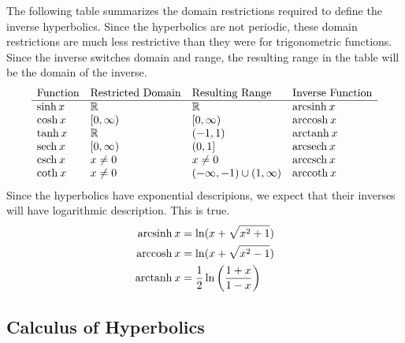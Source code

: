 \documentclass[fleqn]{report}
\begin{document}
The following table summarizes the domain restrictions
required to define the inverse hyperbolics. Since the
hyperbolics are not periodic, these domain restrictions are
much less restrictive than they were for trigonometric
functions. Since the inverse switches domain and range, the
resulting range in the table will be the domain of the
inverse.
\begin{displaymath}
\begin{array}{llll}
\text{Function} & \text{Restricted Domain} & \text{Resulting
Range} & \text{Inverse Function} \\
\hline
\sinh x & \mathbb{R} & \mathbb{R} & \mathrm{arcsinh\hspace{0.07cm}} x \\
\cosh x & [0, \infty) & [0, \infty) & \mathrm{arccosh\hspace{0.07cm}} x \\
\tanh x & \mathbb{R} & (-1,1) & \mathrm{arctanh\hspace{0.07cm}} x \\
\mathrm{sech}\hspace{0.07cm} x & [0, \infty) & (0, 1] & \mathrm{arcsech\hspace{0.07cm}} x \\
\mathrm{csch}\hspace{0.07cm} x & x \neq 0 & x \neq 0 & \mathrm{arccsch\hspace{0.07cm}} x \\
\mathrm{coth}\hspace{0.07cm} x & x \neq 0 & (-\infty,-1) \cup (1, \infty) & \mathrm{arccoth\hspace{0.07cm}} x 
\end{array}
\end{displaymath}
Since the hyperbolics have exponential descripions, we expect
that their inverses will have logarithmic description.
This is true.
\begin{align*}
\mathrm{arcsinh\hspace{0.07cm}} x & = \ln (x + \sqrt{x^2 +1} ) \\
\mathrm{arccosh\hspace{0.07cm}} x & = \ln (x + \sqrt{x^2 -1} ) \\
\mathrm{arctanh\hspace{0.07cm}} x & = \frac{1}{2} \ln \left( \frac{1+x}{1-x} \right) 
\end{align*}

\subsection{Calculus of Hyperbolics}
\label{calculus-hyperbolics}
\end{document}

